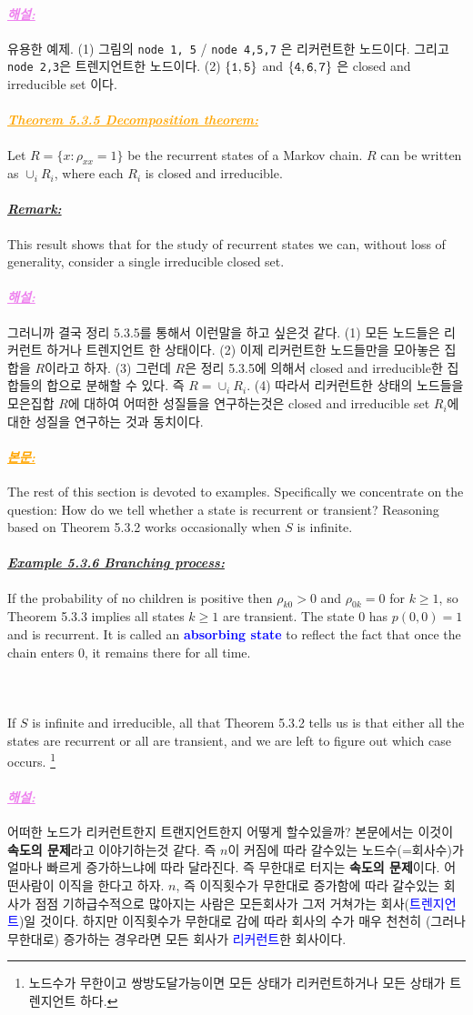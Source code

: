 \documentclass[12pt,oneside,english,a4paper]{article}
\def\bk{\paragraph{\LARGE$$}\LARGE}
\newcommand{\para}[1]{\paragraph{\LARGE\it\underline{\textbf{#1:}}}\LARGE}
\newcommand{\paraviolet}[1]{\paragraph{\LARGE\textcolor{violet}{\it\underline{\textbf{#1:}}}}\LARGE}
\newcommand{\paraorange}[1]{\paragraph{\LARGE\textcolor{orange}{\it\underline{\textbf{#1:}}}}\LARGE}
\begin{document}
\paraviolet{해설} 유용한 예제. (1) 그림의 {\tt node 1, 5} / {\tt node 4,5,7} 은 리커런트한 노드이다. 그리고 {\tt node 2,3}은 트렌지언트한 노드이다. (2) $\tt \{1, 5\}$ and $\tt \{4, 6, 7\}$ 은 closed and irreducible set 이다. 

\paraorange{Theorem 5.3.5 Decomposition theorem} Let $R = \{x : \rho_{xx} = 1\}$ be the recurrent states of a Markov chain. $R$ can be written as $\cup_i R_i$, where each $R_i$ is closed and irreducible.

\para{Remark} This result shows that for the study of recurrent states we
can, without loss of generality, consider a single irreducible closed set.

\paraviolet{해설} 그러니까 결국 정리 5.3.5를 통해서 이런말을 하고 싶은것 같다. (1) 모든 노드들은 리커런트 하거나 트렌지언트 한 상태이다. (2) 이제 리커런트한 노드들만을 모아놓은 집합을 $R$이라고 하자. (3) 그런데 $R$은 정리 5.3.5에 의해서 closed and irreducible한 집합들의 합으로 분해할 수 있다. 즉 $R=\cup_{i}R_i$. (4) 따라서 리커런트한 상태의 노드들을 모은집합 $R$에 대하여 어떠한 성질들을 연구하는것은 closed and irreducible set $R_i$에 대한 성질을 연구하는 것과 동치이다. 

\paraorange{본문} The rest of this section is devoted to examples. Specifically we concentrate on the question: How do we tell whether a state is recurrent or
transient? Reasoning based on Theorem 5.3.2 works occasionally when $S$ is infinite.

\para{Example 5.3.6 Branching process} If the probability of no children
is positive then $\rho_{k0} > 0$ and $\rho_{0k}=0$ for $k \geq 1$, so Theorem 5.3.3 implies all states $k \geq 1$ are transient. The state $0$ has $p(0, 0) = 1$ and is recurrent. It is called an \textcolor{blue}{\bf absorbing state} to reflect the fact that once the chain enters $0$, it remains there for all time.

\bk If $S$ is infinite and irreducible, all that Theorem 5.3.2 tells us is that either all the states are recurrent or all are transient, and we are left to figure out which case occurs. \footnote{노드수가 무한이고 쌍방도달가능이면 모든 상태가 리커런트하거나 모든 상태가 트렌지언트 하다.}

\paraviolet{해설} 어떠한 노드가 리커런트한지 트랜지언트한지 어떻게 할수있을까? 본문에서는 이것이 {\bf 속도의 문제}라고 이야기하는것 같다. 즉 $n$이 커짐에 따라 갈수있는 노드수(=회사수)가 얼마나 빠르게 증가하느냐에 따라 달라진다. 즉 무한대로 터지는 {\bf 속도의 문제}이다. 어떤사람이 이직을 한다고 하자. $n$, 즉 이직횟수가 무한대로 증가함에 따라 갈수있는 회사가 점점 기하급수적으로 많아지는 사람은 모든회사가 그저 거쳐가는 회사(\textcolor{blue}{트렌지언트})일 것이다. 하지만 이직횟수가 무한대로 감에 따라 회사의 수가 매우 천천히 (그러나 무한대로) 증가하는 경우라면 모든 회사가 \textcolor{blue}{리커런트}한 회사이다. 
\end{document}
